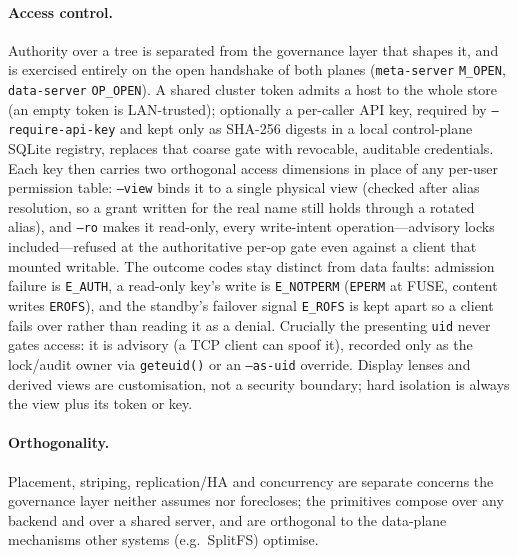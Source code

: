 \documentclass[numberedsection,acmtos]{acmart}
\begin{document}
\paragraph{Access control.} Authority over a tree is separated from the
governance layer that shapes it, and is exercised entirely on the open handshake
of both planes (\texttt{meta-server} \texttt{M\_OPEN}, \texttt{data-server}
\texttt{OP\_OPEN}). A shared cluster token admits a host to the whole store (an
empty token is LAN-trusted); optionally a per-caller API key, required by
\texttt{--require-api-key} and kept only as SHA-256 digests in a local
control-plane SQLite registry, replaces that coarse gate with revocable,
auditable credentials. Each key then carries two orthogonal access dimensions
in place of any per-user permission table: \texttt{--view} binds it to a single
physical view (checked after alias resolution, so a grant written for the real
name still holds through a rotated alias), and \texttt{--ro} makes it read-only,
every write-intent operation---advisory locks included---refused at the
authoritative per-op gate even against a client that mounted writable. The
outcome codes stay distinct from data faults: admission failure is
\texttt{E\_AUTH}, a read-only key's write is \texttt{E\_NOTPERM} (\texttt{EPERM}
at FUSE, content writes \texttt{EROFS}), and the standby's failover signal
\texttt{E\_ROFS} is kept apart so a client fails over rather than reading it as
a denial. Crucially the presenting \texttt{uid} never gates access: it is
advisory (a TCP client can spoof it), recorded only as the lock/audit owner via
\texttt{geteuid()} or an \texttt{--as-uid} override. Display lenses and derived
views are customisation, not a security boundary; hard isolation is always the
view plus its token or key.

\paragraph{Orthogonality.} Placement, striping, replication/HA and concurrency
are separate concerns the governance layer neither assumes nor forecloses; the
primitives compose over any backend and over a shared server, and are
orthogonal to the data-plane mechanisms other systems (e.g.\ SplitFS)
optimise.
\end{document}
